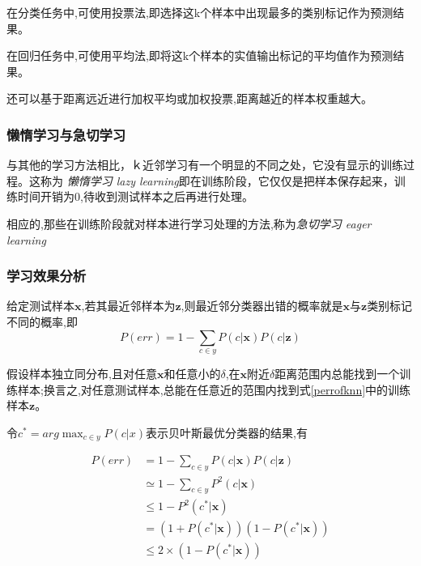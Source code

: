 \documentclass[UTF8,a4paper]{ctexart}%
\begin{document}
              在分类任务中,可使用投票法,即选择这k个样本中出现最多的类别标记作为预测结果。

              在回归任务中,可使用平均法,即将这k个样本的实值输出标记的平均值作为预测结果。

              还可以基于距离远近进行加权平均或加权投票,距离越近的样本权重越大。

          \subsubsection{懒惰学习与急切学习}
              与其他的学习方法相比，ｋ近邻学习有一个明显的不同之处，它没有显示的训练过程。这称为 \emph{懒惰学习 lazy learning}即在训练阶段，它仅仅是把样本保存起来，训练时间开销为0,待收到测试样本之后再进行处理。

              相应的,那些在训练阶段就对样本进行学习处理的方法,称为\emph{急切学习 eager learning}
          \subsubsection{学习效果分析}
              给定测试样本$\mathbf{x}$,若其最近邻样本为$\mathbf{z}$,则最近邻分类器出错的概率就是$\mathbf{x}$与$\mathbf{z}$类别标记不同的概率,即
              \begin{equation}
                  P(err) = 1 - \sum_{c \in y}P(c|\mathbf{x})P(c|\mathbf{z})
                  \label{perrofknn}
              \end{equation}
              {\color{red}{为啥是用后验概率呀?}}

              假设样本独立同分布,且对任意$\mathbf{x}$和任意小的$\delta$,在$\mathbf{x}$附近$\delta$距离范围内总能找到一个训练样本;换言之,对任意测试样本,总能在任意近的范围内找到式\eqref{perrofknn}中的训练样本$\mathbf{z}$。

              令$c^* = arg \max_{c\in y}P(c|x)$表示贝叶斯最优分类器的结果,有

              \begin{align}
                P(err) &= 1 - \sum_{c \in y}P(c|\mathbf{x})P(c|\mathbf{z}) \\
                       &\simeq 1 - \sum_{c \in y}P^2(c|\mathbf{x})\\
                       &\leqslant 1 - P^2(c^*|\mathbf{x})\\
                       &= (1 + P(c^*|\mathbf{x}))(1 - P(c^*|\mathbf{x}))\\
                       &\leqslant 2\times (1 - P(c^*|\mathbf{x}))
              \end{align}
\end{document}
